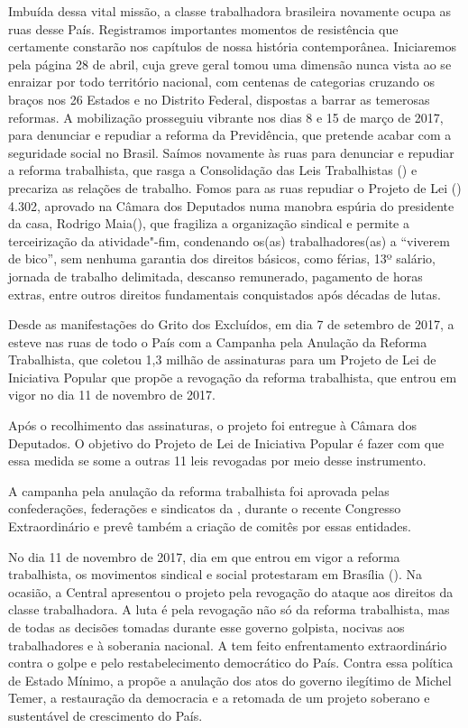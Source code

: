 Imbuída dessa vital missão, a classe trabalhadora brasileira novamente
ocupa as ruas desse País. Registramos importantes momentos de
resistência que certamente constarão nos capítulos de nossa história
contemporânea. Iniciaremos pela página 28 de abril, cuja greve geral
tomou uma dimensão nunca vista ao se enraizar por todo território
nacional, com centenas de categorias cruzando os braços nos 26 Estados e
no Distrito Federal, dispostas a barrar as temerosas reformas. A
mobilização prosseguiu vibrante nos dias 8 e 15 de março de 2017, para
denunciar e repudiar a reforma da Previdência, que pretende acabar com a
seguridade social no Brasil. Saímos novamente às ruas para denunciar e
repudiar a reforma trabalhista, que rasga a Consolidação das Leis
Trabalhistas () e precariza as relações de trabalho. Fomos para as
ruas repudiar o Projeto de Lei () 4.302, aprovado na Câmara dos
Deputados numa manobra espúria do presidente da casa, Rodrigo Maia(),
que fragiliza a organização sindical e permite a terceirização da
atividade"-fim, condenando os(as) trabalhadores(as) a ``viverem de
bico'', sem nenhuma garantia dos direitos básicos, como férias, 13º
salário, jornada de trabalho delimitada, descanso remunerado, pagamento
de horas extras, entre outros direitos fundamentais conquistados após
décadas de lutas.

Desde as manifestações do Grito dos Excluídos, em dia 7 de setembro de 2017, a  esteve nas ruas de todo o País com a Campanha pela Anulação da Reforma Trabalhista, que coletou 1,3 milhão de assinaturas para um Projeto de Lei de Iniciativa Popular que propõe a revogação da reforma trabalhista, que entrou em vigor no dia 11 de novembro de 2017. 

Após o recolhimento das assinaturas, o projeto foi entregue à Câmara dos Deputados. O objetivo do Projeto de Lei de Iniciativa Popular é fazer com que essa medida se some a outras 11 leis revogadas por meio desse instrumento. 

A campanha pela anulação da reforma trabalhista foi aprovada pelas confederações, federações e sindicatos da , durante o recente Congresso Extraordinário e prevê também a criação de comitês por essas entidades.

No dia 11 de novembro de 2017, dia em que entrou em vigor a reforma trabalhista, os movimentos sindical e social protestaram em Brasília (). Na ocasião, a Central apresentou o projeto pela revogação do ataque aos direitos da classe trabalhadora. A luta é pela revogação não só da reforma trabalhista, mas de todas as decisões tomadas durante esse governo golpista, nocivas aos trabalhadores e à soberania nacional. A  tem feito enfrentamento extraordinário contra o golpe e pelo restabelecimento democrático do País. Contra essa política de Estado Mínimo, a  propõe a anulação dos atos do governo ilegítimo de Michel Temer, a restauração da democracia e a retomada de um projeto soberano e sustentável de crescimento do País. 

